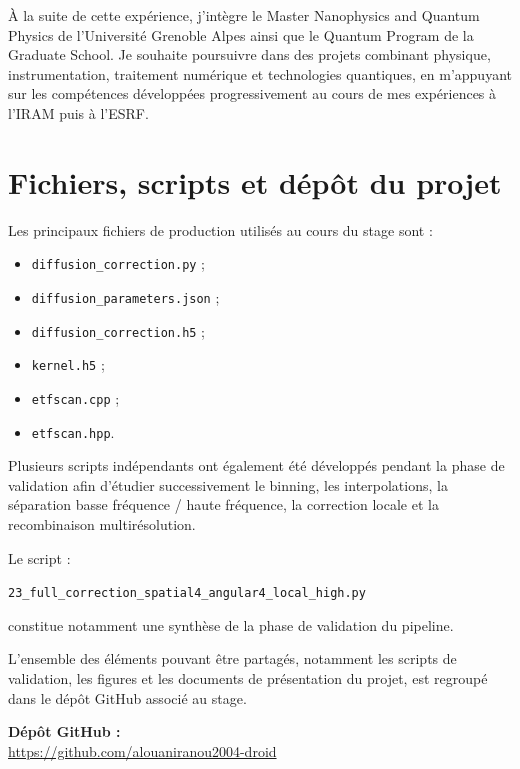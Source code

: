 \documentclass[11pt,a4paper]{report}
\begin{document}
À la suite de cette expérience, j'intègre le Master Nanophysics and Quantum
Physics de l'Université Grenoble Alpes ainsi que le Quantum Program de la
Graduate School. Je souhaite poursuivre dans des projets combinant
physique, instrumentation, traitement numérique et technologies quantiques,
en m'appuyant sur les compétences développées progressivement au cours de
mes expériences à l'IRAM puis à l'ESRF.


\appendix

\chapter{Fichiers, scripts et dépôt du projet}

Les principaux fichiers de production utilisés au cours du stage sont :

\begin{itemize}

    \item \texttt{diffusion\_correction.py} ;
    \item \texttt{diffusion\_parameters.json} ;
    \item \texttt{diffusion\_correction.h5} ;
    \item \texttt{kernel.h5} ;
    \item \texttt{etfscan.cpp} ;
    \item \texttt{etfscan.hpp}.

\end{itemize}

Plusieurs scripts indépendants ont également été développés pendant la
phase de validation afin d'étudier successivement le binning, les
interpolations, la séparation basse fréquence / haute fréquence, la
correction locale et la recombinaison multirésolution.

Le script :

\begin{center}
\texttt{23\_full\_correction\_spatial4\_angular4\_local\_high.py}
\end{center}

constitue notamment une synthèse de la phase de validation du pipeline.

L'ensemble des éléments pouvant être partagés, notamment les scripts de
validation, les figures et les documents de présentation du projet, est
regroupé dans le dépôt GitHub associé au stage.

\begin{center}
\textbf{Dépôt GitHub : }\\
\url{ https://github.com/alouaniranou2004-droid}
\end{center}
\end{document}
